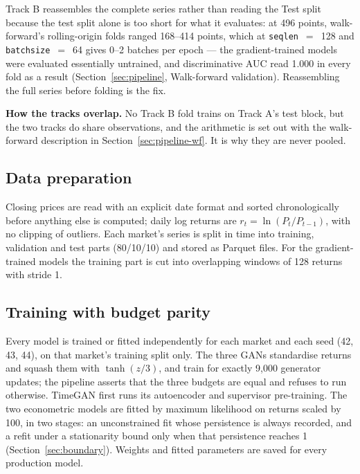 \documentclass[11pt,a4paper]{article}
\makeatletter
\DeclareRobustCommand{\_}{\ifmmode\nfss@text{\textunderscore}\else\textunderscore\allowbreak\fi}
\makeatother
\begin{document}
Track B reassembles the complete series rather than reading the Test split because the test split alone is too short for what it evaluates: at 496 points, walk-forward's rolling-origin folds ranged 168--414 points, which at \texttt{seq\_len}~$=$~128 and \texttt{batch\_size}~$=$~64 gives 0--2 batches per epoch --- the gradient-trained models were evaluated essentially untrained, and discriminative AUC read 1.000 in every fold as a result (Section~\ref{sec:pipeline}, Walk-forward validation). Reassembling the full series before folding is the fix.

\textbf{How the tracks overlap.} No Track B fold trains on Track A's test block, but the two tracks do share observations, and the arithmetic is set out with the walk-forward description in Section~\ref{sec:pipeline-wf}. It is why they are never pooled.

\subsection{Data preparation}
Closing prices are read with an explicit date format and sorted chronologically before anything else is computed; daily log returns are $r_t=\ln(P_t/P_{t-1})$, with no clipping of outliers. Each market's series is split in time into training, validation and test parts (80/10/10) and stored as Parquet files. For the gradient-trained models the training part is cut into overlapping windows of 128 returns with stride 1.

\subsection{Training with budget parity}
Every model is trained or fitted independently for each market and each seed (42, 43, 44), on that market's training split only. The three GANs standardise returns and squash them with $\tanh(z/3)$, and train for exactly 9,000 generator updates; the pipeline asserts that the three budgets are equal and refuses to run otherwise. TimeGAN first runs its autoencoder and supervisor pre-training. The two econometric models are fitted by maximum likelihood on returns scaled by 100, in two stages: an unconstrained fit whose persistence is always recorded, and a refit under a stationarity bound only when that persistence reaches 1 (Section~\ref{sec:boundary}). Weights and fitted parameters are saved for every production model.
\end{document}
